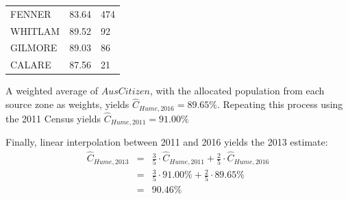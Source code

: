 \documentclass[11pt,a4paper,]{article}
\begin{document}
\begin{longtable}[]{@{}lll@{}}
\begin{minipage}[t]{0.26\columnwidth}\raggedright
FENNER\strut
\end{minipage} & \begin{minipage}[t]{0.19\columnwidth}\raggedright
83.64\strut
\end{minipage} & \begin{minipage}[t]{0.47\columnwidth}\raggedright
474\strut
\end{minipage}\tabularnewline
\begin{minipage}[t]{0.26\columnwidth}\raggedright
WHITLAM\strut
\end{minipage} & \begin{minipage}[t]{0.19\columnwidth}\raggedright
89.52\strut
\end{minipage} & \begin{minipage}[t]{0.47\columnwidth}\raggedright
92\strut
\end{minipage}\tabularnewline
\begin{minipage}[t]{0.26\columnwidth}\raggedright
GILMORE\strut
\end{minipage} & \begin{minipage}[t]{0.19\columnwidth}\raggedright
89.03\strut
\end{minipage} & \begin{minipage}[t]{0.47\columnwidth}\raggedright
86\strut
\end{minipage}\tabularnewline
\begin{minipage}[t]{0.26\columnwidth}\raggedright
CALARE\strut
\end{minipage} & \begin{minipage}[t]{0.19\columnwidth}\raggedright
87.56\strut
\end{minipage} & \begin{minipage}[t]{0.47\columnwidth}\raggedright
21\strut
\end{minipage}\tabularnewline
\bottomrule
\end{longtable}

\normalsize

A weighted average of \(AusCitizen\), with the allocated population from each source zone as weights, yields \(\hat{C}_{Hume,2016} = 89.65 \%\). Repeating this process using the 2011 Census yields \(\hat{C}_{Hume,2011} = 91.00 \%\)

Finally, linear interpolation between 2011 and 2016 yields the 2013 estimate:
\begin{eqnarray*}
\hat{C}_{Hume,2013} & = &\frac{3}{5} \cdot \hat{C}_{Hume,2011} + \frac{2}{5} \cdot \hat{C}_{Hume,2016} \\ 
& = & \frac{3}{5} \cdot 91.00 \% + \frac{2}{5} \cdot 89.65 \% \\ 
& = & 90.46 \%
\end{eqnarray*}
\end{document}
